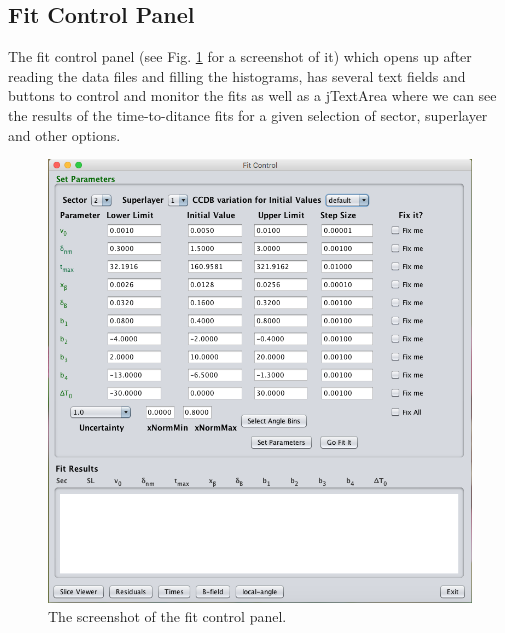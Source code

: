 \documentclass[12pt]{article}
\begin{document}
\subsection{Fit Control Panel}
\label{ssFitControlPanel}

The fit control panel (see Fig. \ref{fFitControlPanel} for a screenshot of it) which opens up after reading the data files and filling the histograms, has several text fields and buttons to control and monitor the fits as well as a jTextArea where we can see the results of the time-to-ditance fits for a given selection of sector, superlayer and other options. 


\begin{figure} [H] %
    \centering
    \includegraphics[width=1.0\textwidth]{Figures/DC_Calib_GUI2.png}
    \caption{The screenshot of the fit control panel.}
    \label{fFitControlPanel}
\end{figure}
\end{document}
